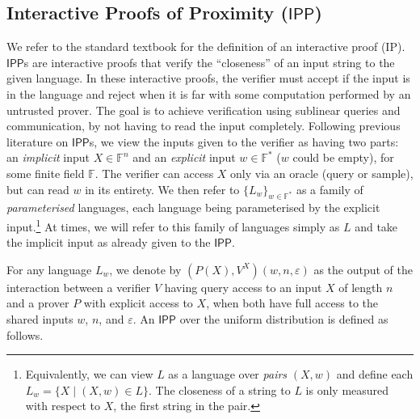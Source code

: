 \documentclass[11pt]{article}
\newcommand{\IPP}{\mathsf{IPP}}
\newcommand{\F}{\mathbb{F}}
\begin{document}
\subsection{Interactive Proofs of Proximity ($\IPP$)}
We refer to the standard textbook \cite{AB09} for the definition of an interactive proof (IP). 
$\IPP$s \cite{EKR04,RVW} are interactive proofs that verify the ``closeness'' of an input string to the given language. In these interactive proofs, the verifier must accept if the input is in the language and reject when it is far with some computation performed by an untrusted prover. The goal is to achieve verification using sublinear queries and communication, by not having to read the input completely. Following previous literature on $\IPP$s, we view the inputs given to the verifier as having two parts: an \textit{implicit} input $X \in \F^n$ and an \textit{explicit} input $w \in \F^*$ ($w$ could be empty), for some finite field $\F$. The verifier can access $X$ only via an oracle (query or sample), but can read $w$ in its entirety. We then refer to $\{L_w\}_{w \in \F^*}$ as a family of \textit{parameterised} languages, each language being parameterised by the explicit input.\footnote{Equivalently, we can view $L$ as a language over \textit{pairs} $(X,w)$ and define each $L_w = \{X \mid (X,w) \in L\}$. The closeness of a string to $L$ is only measured with respect to $X$, the first string in the pair.} At times, we will refer to this family of languages simply as $L$ and take the implicit input as already given to the $\IPP$.

For any language $L_w$, we denote by $(P(X),V^{X})(w, n, \varepsilon)$ as the output of the interaction between a verifier $V$ having query access to an input $X$ of length $n$ and a prover $P$ with explicit access to $X$, when both have full access to the shared inputs $w$, $n$, and $\varepsilon$. An $\IPP$ over the uniform distribution is defined as follows.
\end{document}
